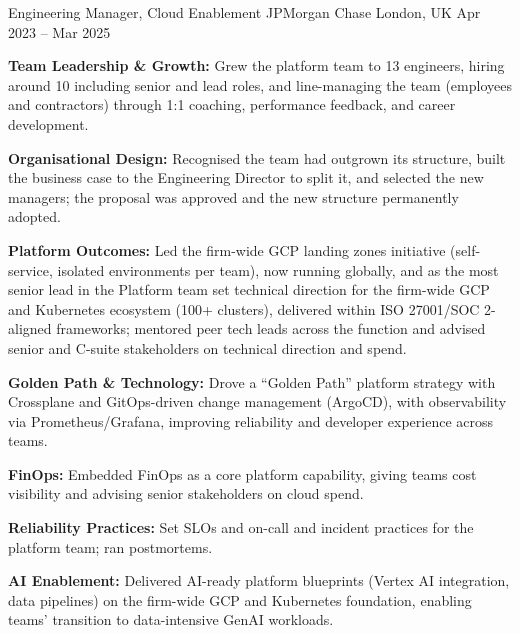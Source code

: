 \begin{cventries}
  \vspace{3mm}
  \cventry
  {Engineering Manager, Cloud Enablement}
  {JPMorgan Chase}
  {London, UK}
  {Apr 2023 -- Mar 2025}
  {
    \begin{cvitems}
      \item {\textbf{Team Leadership \& Growth:} Grew the platform team to 13 engineers, hiring around 10 including senior and lead
                roles, and line-managing the team (employees and contractors) through 1:1 coaching, performance feedback, and
                career development.}
      \item {\textbf{Organisational Design:} Recognised the team had outgrown its structure, built the business case to the
                Engineering Director to split it, and selected the new managers; the proposal was approved and the new structure
                permanently adopted.}
      \item {\textbf{Platform Outcomes:} Led the firm-wide GCP landing zones initiative (self-service, isolated environments per team), now running globally, and as the most senior
                lead in the Platform team set technical direction for the firm-wide GCP and Kubernetes ecosystem (100+ clusters),
                delivered within ISO 27001/SOC 2-aligned frameworks; mentored peer tech leads across the function and advised senior and C-suite stakeholders on technical direction and spend.}
      \item {\textbf{Golden Path \& Technology:} Drove a ``Golden Path'' platform strategy with Crossplane and GitOps-driven change management (ArgoCD), with
                observability via Prometheus/Grafana, improving reliability and developer experience across teams.}
      \item {\textbf{FinOps:} Embedded FinOps as a core platform capability, giving teams cost visibility and advising senior stakeholders on cloud spend.}
      \item {\textbf{Reliability Practices:} Set SLOs and on-call and incident practices for the platform team; ran postmortems.}
      \item {\textbf{AI Enablement:} Delivered AI-ready platform blueprints (Vertex AI integration, data pipelines) on the firm-wide GCP and Kubernetes foundation, enabling teams' transition to data-intensive GenAI workloads.}
    \end{cvitems}
  }


\end{cventries}
